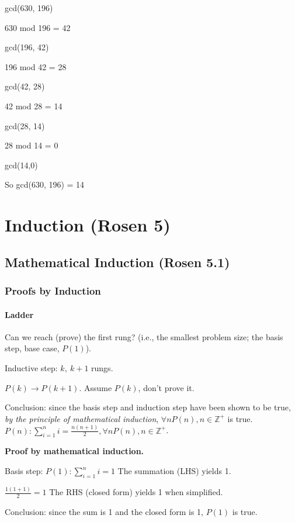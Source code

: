 \documentclass[english,openany]{book}
\begin{document}
    gcd(630, 196)

    630 mod 196 = 42

    gcd(196, 42)

    196 mod 42 = 28

    gcd(42, 28)

    42 mod 28 = 14

    gcd(28, 14)

    28 mod 14 = 0

    gcd(14,0)

    So gcd(630, 196) = 14

    \chapter{Induction (Rosen 5)}

    \section{Mathematical Induction (Rosen 5.1)}

    \subsection{Proofs by Induction}

    \subsubsection{Ladder}

    Can we reach (prove) the first rung? (i.e., the smallest problem size; the basis step, base case, $P(1)$).

    Inductive step: $k,\ k+1$ rungs.

    $P(k) \rightarrow P(k+1)$. Assume $P(k)$, don't prove it.

    Conclusion: since the basis step and induction step have been shown to be true, \textit{by the principle of mathematical induction}, $\forall n P(n), n \in \mathbb Z^+$ is true. \\

    $P(n): \sum_{i=1}^{n} i = \frac{n(n+1)}{2}, \forall n P(n), n \in \mathbb Z^+$.

    \textbf{Proof by mathematical induction.}

    Basis step: $P(1): \sum_{i=1}^{n} i = 1$ The summation (LHS) yields 1.

    $\frac{1(1+1)}{2} = 1$ The RHS (closed form) yields 1 when simplified.

    Conclusion: since the sum is 1 and the closed form is 1, $P(1)$ is true.
\end{document}
